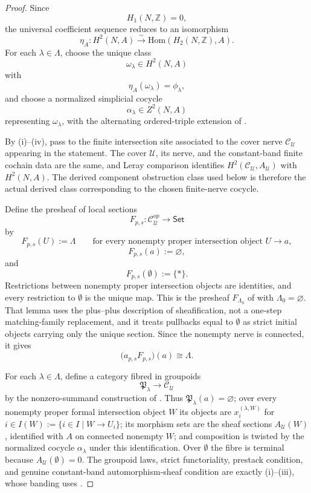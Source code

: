 \begin{proof}
Since
\[
H_1(N,\mathbb Z)=0,
\]
the universal coefficient sequence reduces to an isomorphism
\[
\eta_A:H^2(N,A)\xrightarrow{\sim}\mathrm{Hom}(H_2(N,\mathbb Z),A).
\]
For each $\lambda\in\Lambda$, choose the unique class
\[
\omega_\lambda\in H^2(N,A)
\]
with
\[
\eta_A(\omega_\lambda)=\phi_\lambda,
\]
and choose a normalized simplicial cocycle
\[
\alpha_\lambda\in Z^2(N,A)
\]
representing $\omega_\lambda$, with the alternating ordered-triple extension
of .

By (i)--(iv), pass to the
finite intersection site associated to the cover nerve $\mathcal C_{\mathcal U}$ appearing in the statement.
The cover $\mathcal U$, its nerve, and the constant-band finite cochain
data are the same, and Leray comparison identifies
$H^2(\mathcal C_{\mathcal U},A_{\mathcal U})$ with $H^2(N,A)$. The derived component obstruction class
used below is therefore the actual derived class corresponding to the
chosen finite-nerve cocycle.

Define the presheaf of local sections
\[
F_{p,s}:\mathcal C_{\mathcal U}^{op}\to\mathsf{Set}
\]
by
\[
F_{p,s}(U):=\Lambda
\qquad
\text{for every nonempty proper intersection object }U\to a,
\]
\[
F_{p,s}(a):=\varnothing,
\]
and
\[
F_{p,s}(\emptyset):=\{\ast\}.
\]
Restrictions between nonempty proper intersection objects are identities,
and every restriction to $\emptyset$ is the unique map. This is the
presheaf \(F_{\Lambda_0}\) of
 with \(\Lambda_0=\varnothing\).
That lemma uses the plus--plus description of sheafification, not a
one-step matching-family replacement, and it treats pullbacks equal to
\(\emptyset\) as strict initial objects carrying only the unique section.
Since the nonempty nerve is connected, it gives
\[
\bigl(a_{p,s}F_{p,s}\bigr)(a)\cong \Lambda.
\]

For each $\lambda\in\Lambda$, define a category fibred in groupoids
\[
\mathfrak P_\lambda\to \mathcal C_{\mathcal U}
\]
by the nonzero-summand construction of
. Thus
$\mathfrak P_\lambda(a)=\varnothing$; over every nonempty proper formal
intersection object $W$ its objects are
$x_i^{(\lambda,W)}$ for $i\in I(W):=\{i\in I\mid W\to U_i\}$; its morphism
sets are the sheaf sections $A_{\mathcal U}(W)$, identified with \(A\) on
connected nonempty \(W\); and composition is twisted by the normalized
cocycle $\alpha_\lambda$ under this identification. Over $\emptyset$ the
fibre is terminal because \(A_{\mathcal U}(\emptyset)=0\). The groupoid
laws, strict functoriality, prestack
condition, and genuine constant-band automorphism-sheaf condition are
exactly (i)--(iii), whose banding
uses .


\end{proof}
